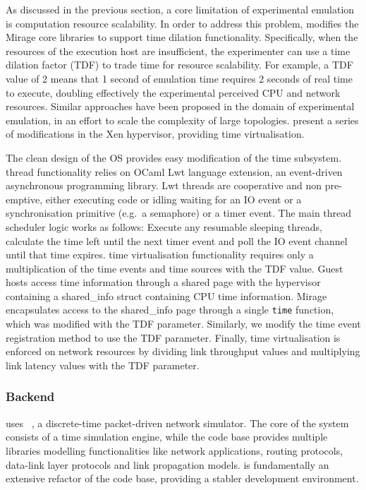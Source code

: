 As discussed in the previous section, a core limitation of experimental
emulation is computation resource scalability. In order to address this problem,  
\sdnsim modifies the Mirage core libraries to support time
dilation functionality.  Specifically, when the resources of the execution host
are insufficient, the experimenter can use a time dilation factor (TDF) to trade
time for resource scalability. For example, a TDF value of 2 means that 1 second
of emulation time requires 2 seconds of real time to execute, doubling
effectively the experimental perceived CPU and network resources. Similar
approaches have been proposed in the domain of experimental emulation, in an
effort to scale the complexity of large topologies.   present a
series of modifications in the Xen hypervisor, providing time virtualisation.

The clean design of the \mirage OS provides easy modification of the time
subsystem. \mirage thread functionality relies on OCaml Lwt language extension,
an event-driven asynchronous programming library.  Lwt threads are cooperative
and non pre-emptive, either executing code or idling waiting for an IO event or a
synchronisation primitive (e.g.~a semaphore) or a timer event. The main thread
scheduler logic works as follows: Execute any resumable sleeping threads,
calculate the time left until the next timer event and poll the IO event channel
until that time expires. \sdnsim time virtualisation functionality requires only
a multiplication of the time events and time sources with the TDF value.  Guest
hosts access time information through a shared page with the hypervisor
containing a shared\_info struct containing CPU time information. Mirage
encapsulates access to the shared\_info page through a single \texttt{time}
function, which was modified with the TDF parameter. Similarly, we modify the
time event registration method to use the TDF parameter. Finally, time
virtualisation is enforced on network resources by dividing link throughput
values and multiplying link latency values with the TDF parameter. 

\subsubsection{ Backend}

\sdnsim uses ~, a discrete-time packet-driven network
simulator. The core of the system consists
of a time simulation engine, while the code base provides multiple libraries
modelling functionalities like network applications, routing protocols,
data-link layer protocols and link propagation models.  is fundamentally
an extensive refactor of the  code base, providing a stabler development
environment. 


